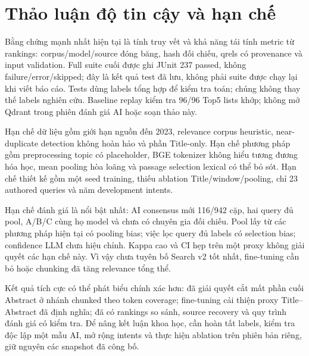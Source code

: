 \section{Thảo luận độ tin cậy và hạn chế}
Bằng chứng mạnh nhất hiện tại là tính truy vết và khả năng tái tính metric từ rankings: corpus/model/source đóng băng, hash đối chiếu, qrels có provenance và input validation. Full suite cuối được ghi JUnit 237 passed, không failure/error/skipped; đây là kết quả test đã lưu, không phải suite được chạy lại khi viết báo cáo. Tests dùng labels tổng hợp để kiểm tra toán; chúng không thay thế labels nghiên cứu. Baseline replay kiểm tra 96/96 Top5 lists khớp; không mở Qdrant trong phiên đánh giá AI hoặc soạn thảo này.

Hạn chế dữ liệu gồm giới hạn nguồn đến 2023, relevance corpus heuristic, near-duplicate detection không hoàn hảo và phần Title-only. Hạn chế phương pháp gồm preprocessing topic có placeholder, BGE tokenizer không hiểu tương đương hóa học, mean pooling hòa loãng và passage selection lexical có thể bỏ sót. Hạn chế thiết kế gồm một seed training, thiếu ablation Title/window/pooling, chỉ 23 authored queries và năm development intents.

Hạn chế đánh giá là nổi bật nhất: AI consensus mới 116/942 cặp, hai query đủ pool, A/B/C cùng họ model và chưa có chuyên gia đối chiếu. Pool lấy từ các phương pháp hiện tại có pooling bias; việc lọc query đủ labels có selection bias; confidence LLM chưa hiệu chỉnh. Kappa cao và CI hẹp trên một proxy không giải quyết các hạn chế này. Vì vậy chưa tuyên bố Search v2 tốt nhất, fine-tuning cần bỏ hoặc chunking đã tăng relevance tổng thể.

Kết quả tích cực có thể phát biểu chính xác hơn: đã giải quyết cắt mất phần cuối Abstract ở nhánh chunked theo token coverage; fine-tuning cải thiện proxy Title--Abstract đã định nghĩa; đã có rankings so sánh, source recovery và quy trình đánh giá có kiểm tra. Để nâng kết luận khoa học, cần hoàn tất labels, kiểm tra độc lập một mẫu AI, mở rộng intents và thực hiện ablation trên phiên bản riêng, giữ nguyên các snapshot đã công bố.
